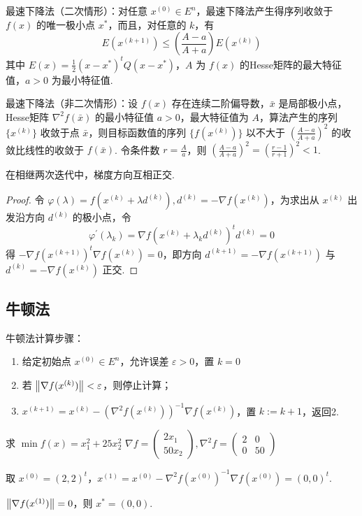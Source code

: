 \begin{note}
    最速下降法（二次情形）：对任意 $x^{(0)} \in E^n$，最速下降法产生得序列收敛于 $f(x)$ 的唯一极小点 $x^*$，而且，对任意的 $k$，有\[E(x^{(k + 1)}) \le \left(\frac{A - a}{A + a}\right)E(x^{(k)})\] 其中 $E(x) = \frac{1}{2}(x - x^*)^tQ(x - x^*)$，$A$ 为 $f(x)$ 的Hesse矩阵的最大特征值，$a > 0$ 为最小特征值.

    最速下降法（非二次情形）：设 $f(x)$ 存在连续二阶偏导数，$\bar{x}$ 是局部极小点，Hesse矩阵 $\nabla^2f(\bar{x})$ 的最小特征值 $a > 0$，最大特征值为 $A$，算法产生的序列 $\{x^{(k)}\}$ 收敛于点 $\bar{x}$，则目标函数值的序列 $\{f(x^{(k)})\}$ 以不大于 $\left(\frac{A - a}{A + a}\right)^2$ 的收敛比线性的收敛于 $f(\bar{x})$. 令条件数 $r = \frac{A}{a}$，则 $\left(\frac{A-a}{A+a}\right)^{2}=\left(\frac{r-1}{r+1}\right)^{2}<1$.
\end{note}

\begin{note}
    在相继两次迭代中，梯度方向互相正交.
    \begin{proof}
        令 $\varphi(\lambda) = f(x^{(k)} + \lambda d^{(k)}), d^{(k)} = -\nabla f(x^{(k)})$，为求出从 $x^{(k)}$ 出发沿方向 $d^{(k)}$ 的极小点，令 \[\varphi^\prime(\lambda_k) = \nabla f(x^{(k)} + \lambda_kd^{(k)})^td^{(k)} = 0\] 得 $-\nabla f(x^{(k + 1)})^t\nabla f(x^{(k)}) = 0$，即方向 $d^{(k + 1)} = -\nabla f(x^{(k + 1)})$ 与 $d^{(k)} = -\nabla f(x^{(k)})$ 正交.
    \end{proof}
\end{note}

\subsection{牛顿法}
\begin{note}
    牛顿法计算步骤：\begin{enumerate}
        \item 给定初始点 $x^{(0)} \in E^n$，允许误差 $\varepsilon > 0$，置 $k = 0$
        \item 若 $\norm{\nabla f(x^{(k)})} < \varepsilon$，则停止计算；
        \item $x^{(k + 1)} = x^{(k)} - \left(\nabla^2f(x^{(k)})\right)^{-1}\nabla f(x^{(k)})$，置 $k:=k + 1$，返回2.
    \end{enumerate}
\end{note}

\begin{example}
    求 $\min f(x) = x_1^2 + 25x_2^2$
    \answer $\nabla f = \begin{pmatrix}
        2x_1\\ 50x_2
    \end{pmatrix}, \nabla^2f = \begin{pmatrix}
        2 & 0 \\ 0 & 50
    \end{pmatrix}$
    
    取 $x^{(0)} = (2, 2)^t$，$x^{(1)} = x^{(0)} - \nabla^2f(x^{(0)})^{-1}\nabla f(x^{(0)}) = (0, 0)^t$. 
    
    $\norm{\nabla f(x^{(1)})} = 0$，则 $x^* = (0, 0)$.
\end{example}

